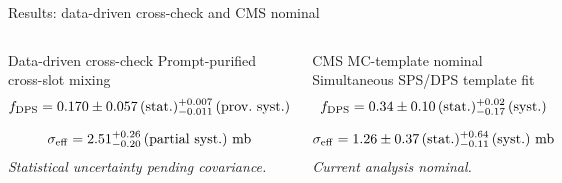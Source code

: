 \documentclass[11pt,aspectratio=169]{beamer}
\begin{document}
\begin{frame}[label=p21]{Results: data-driven cross-check and CMS nominal}
\vspace{6pt}
\begin{columns}[T]
\begin{exampleblock}{Data-driven cross-check}
\centering
{\small Prompt-purified cross-slot mixing}\\[0.7em]
{\small
\[
\begin{gathered}
f_{\rm DPS}=0.170\pm0.057\,(\mathrm{stat.})
  {}^{+0.007}_{-0.011}\,(\mathrm{prov.\ syst.})\\[0.7em]
\sigma_{\rm eff}=2.51
  {}^{+0.26}_{-0.20}\,(\mathrm{partial\ syst.})\ \mathrm{mb}
\end{gathered}
\]
}
\textit{Statistical uncertainty pending covariance.}
\end{exampleblock}
\begin{block}{CMS MC-template nominal}
\centering
{\small Simultaneous SPS/DPS template fit}\\[0.7em]
{\small
\[
\begin{gathered}
f_{\rm DPS}=0.34\pm0.10\,(\mathrm{stat.})
  {}^{+0.02}_{-0.17}\,(\mathrm{syst.})\\[0.7em]
\sigma_{\rm eff}=1.26\pm0.37\,(\mathrm{stat.})
  {}^{+0.64}_{-0.11}\,(\mathrm{syst.})\ \mathrm{mb}
\end{gathered}
\]
}
\textit{Current analysis nominal.}
\end{block}
\end{columns}
\vfill
\centering
{}
\end{frame}
\end{document}
